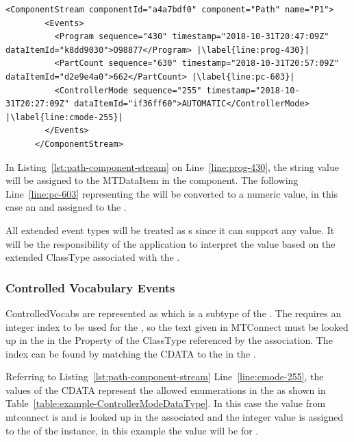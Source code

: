 \begin{lstlisting}[firstnumber=last,escapechar=|,%
    caption={Path Component Stream},label={lst:path-component-stream}]
      <ComponentStream componentId="a4a7bdf0" component="Path" name="P1">
        <Events>
          <Program sequence="430" timestamp="2018-10-31T20:47:09Z" dataItemId="k8dd9030">O98877</Program> |\label{line:prog-430}|
          <PartCount sequence="630" timestamp="2018-10-31T20:57:09Z" dataItemId="d2e9e4a0">662</PartCount> |\label{line:pc-603}|
          <ControllerMode sequence="255" timestamp="2018-10-31T20:27:09Z" dataItemId="if36ff60">AUTOMATIC</ControllerMode> |\label{line:cmode-255}|
        </Events>
      </ComponentStream>
\end{lstlisting}

In Listing~\ref{lst:path-component-stream} on Line~\ref{line:prog-430}, the string value will be assigned to the  \gls{MTDataItem} in the  component. The following Line~\ref{line:pc-603} representing the  will be converted to a numeric value, in this case an  and assigned to the .

All extended event types will be treated as s since it can support any value. It will be the responsibility of the application to interpret the value based on the extended \gls{ClassType} associated with the .

\subsubsection{Controlled Vocabulary Events}

\glspl{ControlledVocab} are represented as  which is a subtype of the . The  requires an integer index to be used for the , so the text given in MTConnect must be looked up in the  in the  \gls{Property} of the \gls{ClassType} referenced by the  association. The index can be found by matching the \gls{CDATA} to the  in the .

Referring to Listing~\ref{lst:path-component-stream} Line~\ref{line:cmode-255}, the values of the \gls{CDATA} represent the allowed enumerations in the  as shown in Table~\ref{table:example-ControllerModeDataType}. In this case the value from mtconnect is  and is looked up in the associated  and the integer value is assigned to the  of the  instance, in this example the value will be  for .

